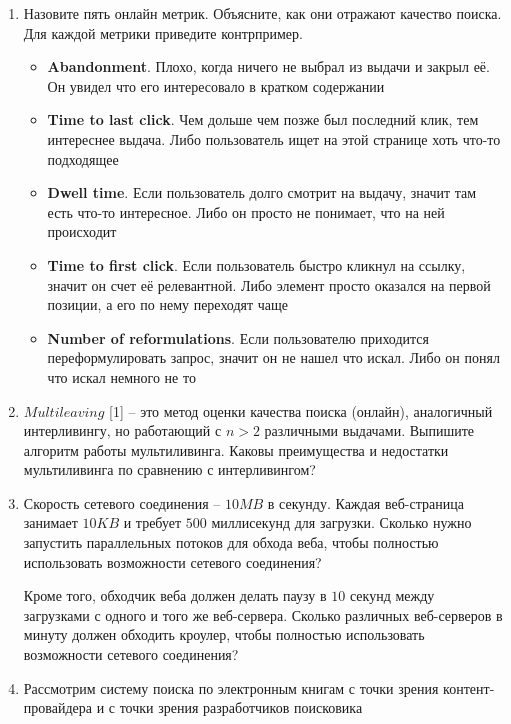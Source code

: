\begin{enumerate}
	\item Назовите пять онлайн метрик. Объясните, как они отражают качество поиска. Для 
	каждой метрики приведите контрпример.
	\begin{itemize}
		\item \textbf{Abandonment}. Плохо, когда ничего не выбрал из выдачи и закрыл её. Он увидел что его интересовало в кратком содержании
		\item \textbf{Time to last click}. Чем дольше чем позже был последний клик, тем интереснее выдача. Либо пользователь ищет на этой странице хоть что-то подходящее 
		\item \textbf{Dwell time}. Если пользователь долго смотрит на выдачу, значит там есть что-то интересное. Либо он просто не понимает, что на ней происходит
		\item \textbf{Time to first click}. Если пользователь быстро кликнул на ссылку, значит он счет её релевантной. Либо элемент просто оказался на первой позиции, а его по нему переходят чаще
		\item \textbf{Number of reformulations}. Если пользователю приходится переформулировать запрос, значит он не нашел что искал. Либо он понял что искал немного не то
	\end{itemize}
	
	\item $Multileaving$ [1] – это метод оценки качества поиска (онлайн), аналогичный 
	интерливингу, но работающий с $n > 2$ различными выдачами. Выпишите алгоритм работы 
	мультиливинга. Каковы преимущества и недостатки мультиливинга по сравнению с 
	интерливингом?
	
	\item Скорость сетевого соединения – $10MB$ в секунду. Каждая веб-страница занимает 
	$10KB$ и требует $500$ миллисекунд для загрузки. Сколько нужно запустить параллельных 
	потоков для обхода веба, чтобы полностью использовать возможности сетевого соединения?

	Кроме того, обходчик веба должен делать паузу в $10$ секунд между загрузками с одного и 
	того же веб-сервера. Сколько различных веб-серверов в минуту должен обходить кроулер, 
	чтобы полностью использовать возможности сетевого соединения?

	\item Рассмотрим систему поиска по электронным книгам с точки зрения контент-провайдера и 
	с точки зрения разработчиков поисковика
	

\end{enumerate}
